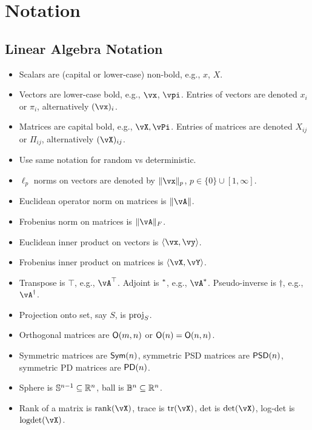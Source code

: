 \chapter*{Notation}


\section*{Linear Algebra Notation}
\begin{itemize}
    \item Scalars are (capital or lower-case) non-bold, e.g., \(x\), \(X\).
    \item Vectors are lower-case bold, e.g., \(\vx\), \(\vpi\). Entries of vectors are denoted \(x_{i}\) or \(\pi_{i}\), alternatively \((\vx)_{i}\).
    \item Matrices are capital bold, e.g., \(\vX, \vPi\). Entries of matrices are denoted \(X_{ij}\) or \(\Pi_{ij}\), alternatively \((\vX)_{ij}\).
    \item Use same notation for random vs deterministic.
    \item \(\ell_{p}\) norms on vectors are denoted by \(\norm{\vx}_{p}\), \(p \in \{0\} \cup [1, \infty]\).
    \item Euclidean operator norm on matrices is \(\norm{\vA}\).
    \item Frobenius norm on matrices is \(\norm{\vA}_{F}\).
    \item Euclidean inner product on vectors is \(\ip{\vx}{\vy}\).
    \item Frobenius inner product on matrices is \(\ip{\vX}{\vY}\).
    \item Transpose is \(\top\), e.g., \(\vA^{\top}\). %
    Adjoint is $^{\ast}$, e.g., $\vA\adj$. %
    Pseudo-inverse is \(\dagger\), e.g., \(\vA^{\dagger}\).
    \item Projection onto set, say \(S\), is \(\operatorname{proj}_{S}\).
    \item Orthogonal matrices are \(\mathsf{O}(m, n)\) or \(\mathsf{O}(n) = \mathsf{O}(n, n)\).
    \item Symmetric matrices are \(\mathsf{Sym}(n)\), symmetric PSD matrices are \(\mathsf{PSD}(n)\), symmetric PD matrices are \(\mathsf{PD}(n)\).
    \item Sphere is \(\mathbb{S}^{n - 1} \subseteq \mathbb{R}^{n}\), ball is \(\mathbb{B}^{n} \subseteq \mathbb{R}^{n}\).
    \item Rank of a matrix is \(\rank(\vX)\), trace is \(\tr(\vX)\), det is \(\det(\vX)\), log-det is \(\logdet(\vX)\).

\end{itemize}
